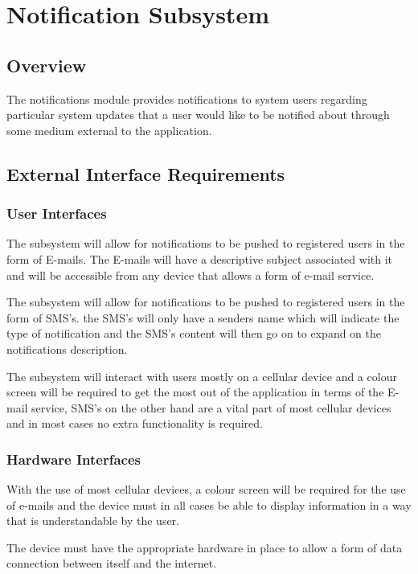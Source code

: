 \documentclass{article}
\begin{document}
    
    \section{Notification Subsystem}
    
    \subsection{Overview}
    The notifications module provides notifications to system users regarding
    particular system updates that a user would like to be notified about through
    some medium external to the application.
    
    \subsection{External Interface Requirements}
    
    \subsubsection{User Interfaces}
    
    The subsystem will allow for notifications to be pushed to registered users in the form of E-mails. The E-mails will have a descriptive subject associated with it and will be accessible from any device that allows a form of e-mail service.

    \begin{flushleft}
    

    The subsystem will allow for notifications to be pushed to registered users in the form of SMS's. the SMS's will only have a senders name which will indicate the type of notification and the SMS's content will then go on to expand on the notifications description.
	\newline

    The subsystem will interact with users mostly on a cellular device and a colour screen will be required to get the most out of the application in terms of the E-mail service, SMS's on the other hand are a vital part of most cellular devices and in most cases no extra functionality is required.

   	  \end{flushleft}
   	\subsubsection{Hardware Interfaces}
    \begin{flushleft}
    With the use of most cellular devices, a colour screen will be required for the use of e-mails and the device must in all cases be able to display information in a way that is understandable by the user.
\newline

    The device must have the appropriate hardware in place to allow a form of data connection between itself and the internet.
    \end{flushleft}
	
\end{document}
